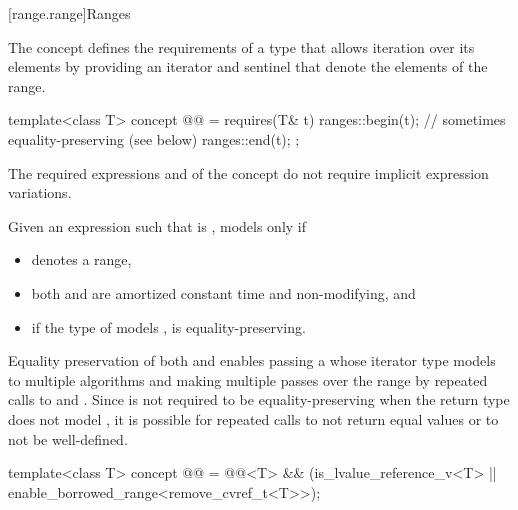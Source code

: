 [range.range]{Ranges}

\pnum
The  concept defines the requirements of a type that allows
iteration over its elements by providing an iterator and sentinel
that denote the elements of the range.

\begin{itemdecl}
template<class T>
  concept @@ =
    requires(T& t) {
      ranges::begin(t);         // sometimes equality-preserving (see below)
      ranges::end(t);
    };
\end{itemdecl}

\begin{itemdescr}
\pnum
The required expressions
and
of the  concept
do not require implicit expression variations.

\pnum
Given an expression  such that  is ,
 models  only if
\begin{itemize}
\item {}
  denotes a range,

\item both
and
are amortized constant time and non-modifying, and

\item if the type of  models
,  is equality-preserving.
\end{itemize}

\pnum
\begin{note}
Equality preservation of both  and
 enables passing a  whose iterator
type models  to multiple
algorithms and making multiple passes over the range by repeated calls to
 and .
Since  is not required to be equality-preserving
when the return type does not model ,
it is possible for repeated calls
to not return equal values or to not be well-defined.
\end{note}
\end{itemdescr}

\begin{itemdecl}
template<class T>
  concept @@ =
    @@<T> && (is_lvalue_reference_v<T> || enable_borrowed_range<remove_cvref_t<T>>);
\end{itemdecl}

